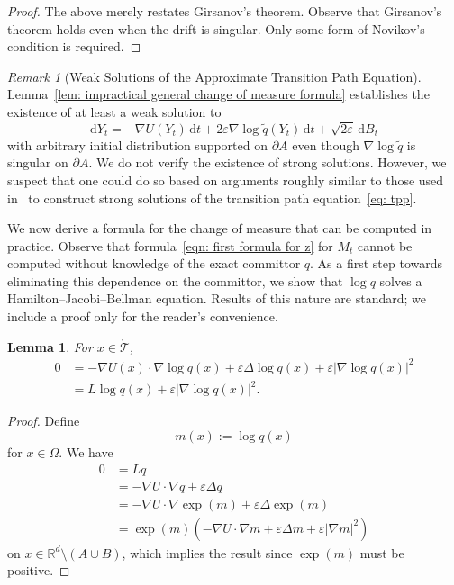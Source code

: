 \documentclass[reqno]{amsart}
\newcommand{\eps}{\varepsilon}
\newcommand{\1}{\mathds{1}}
\renewcommand{\d}{\mathrm{d}}
\newcommand{\grad}{\nabla}
\newcommand{\lap}{\Delta}
\renewcommand{\L}{L}
\newcommand{\zed}{M}
\newtheorem{lemma}{Lemma}
\theoremstyle{definition}
\theoremstyle{remark}
\newtheorem{remark}{Remark}
\newcommand{\D}{\mathscr{T}}
\begin{document}
\begin{proof}
  The above merely restates Girsanov's theorem. Observe that Girsanov's theorem holds even when the drift is singular. Only some form of Novikov's condition is required. 
\end{proof}

\begin{remark}[Weak Solutions of the Approximate Transition Path Equation]
Lemma~\ref{lem: impractical general change of measure formula} establishes the existence of at least a weak solution to 
\begin{equation*}
  \d Y_t =  -\grad U(Y_t)\, \d t + 2 \eps \grad \log \tilde q(Y_t) \, \d t + \sqrt{2 \eps} \, \d B_t
\end{equation*}
with arbitrary initial distribution supported on $\partial A$ even though $\grad \log \tilde q$ is singular on $\partial A$. We do not verify the existence of strong solutions. However, we suspect that one could do so based on arguments roughly similar to those used in~\cite{lu_reactive_2015} to construct strong solutions of the transition path equation~\eqref{eq: tpp}.
\end{remark}

We now derive a formula for the change of measure that can be computed in practice. Observe that formula~\eqref{eqn: first formula for z} for $\zed_t$ cannot be computed without knowledge of the exact committor $q$. As a first step towards eliminating this dependence on the committor, we show that $\log q$ solves a Hamilton--Jacobi--Bellman equation. Results of this nature are standard; we include a proof only for the reader's convenience. 

\begin{lemma}\label{lem: hjb equation}
  For $x \in \mathring{\D}$,
  \begin{align*}
    0 &=-\grad U (x) \cdot \grad \log q(x) + \eps \lap \log q(x) + \eps \lvert \grad \log q (x) \rvert^2 \\
      &= \L \log q (x) + \eps \lvert \grad \log q(x) \rvert^2.
  \end{align*}
\end{lemma}

\begin{proof}
   Define 
  \begin{equation*}
    m(x):= \log q(x)
  \end{equation*}
  for $x \in \Omega$. We have 
  \begin{align*}
    0&= \L q \\
     &= -\grad U \cdot \grad q + \eps \lap q \\
     &= - \grad U \cdot \grad \exp(m ) + \eps \lap \exp(m) \\
     &= \exp(m) ( -\grad U  \cdot \grad m + \eps \lap m + \eps \lvert \grad m\rvert^2 )
  \end{align*}
  on $x \in \mathbb{R}^d \setminus (A \cup B)$, which implies the result since $\exp(m)$ must be positive.
\end{proof}
\end{document}
